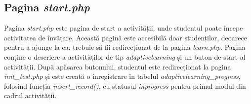 \subsection{Pagina \textit{start.php}}
Pagina \textit{start.php} este pagina de start a activității, unde studentul poate începe activitatea de învățare. Această pagină este accesibilă doar studenților, deoarece pentru a ajunge 
la ea, trebuie să fii redirecționat de la pagina \textit{learn.php}. Pagina conține o descriere a activităților de tip \textit{adaptivelearning} și un buton de start al activității.
După apăsarea butonului, studentul este redirecționat la pagina \textit{init\_test.php} și este creată o înregistrare în tabelul \textit{adaptivelearning\_progress}, folosind funcția 
\textit{insert\_record()}, cu statusul \textit{inprogress} pentru primul modul din cadrul activității.

